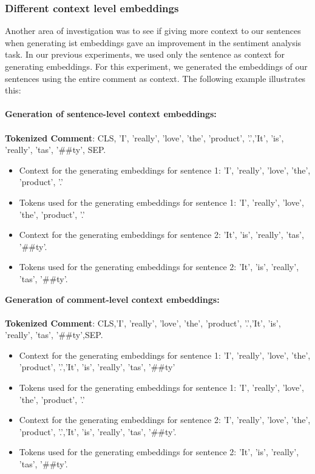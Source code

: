 \subsubsection{Different context level embeddings}
\label{sentenceCommentLevelContextExperiment}
Another area of investigation was to see if giving more context to our sentences when generating ist embeddings gave an improvement in the sentiment analysis task.
In our previous experiments, we used only the sentence as context for generating embeddings. For this experiment, we generated the embeddings of our sentences using the entire comment as context.
The following example illustrates this:\\\\
{\bf Generation of sentence-level context embeddings:}\\\\
{\bf Tokenized Comment}: CLS, {\color{TUMBlau}'I', 'really', 'love', 'the', 'product', '.'},{\color{red}'It', 'is', 'really', 'tas', '\#\#ty'}, SEP.\\
\begin{itemize}
  \item Context for the generating embeddings for {\color{TUMBlau} sentence 1}: 'I', 'really', 'love', 'the', 'product', '.'
  \item Tokens used for the generating embeddings for {\color{TUMBlau} sentence 1}: 'I', 'really', 'love', 'the', 'product', '.'
  \item Context for the generating embeddings for {\color{red} sentence 2}: 'It', 'is', 'really', 'tas', '\#\#ty'.
  \item Tokens used for the generating embeddings for {\color{red} sentence 2}: 'It', 'is', 'really', 'tas', '\#\#ty'.
\end{itemize}
{\bf Generation of comment-level context embeddings:}\\\\
{\bf Tokenized Comment}: CLS,{\color{TUMBlau}'I', 'really', 'love', 'the', 'product', '.'},{\color{red}'It', 'is', 'really', 'tas', '\#\#ty'},SEP.
\begin{itemize}
  \item Context for the generating embeddings for {\color{TUMBlau} sentence 1}: 'I', 'really', 'love', 'the', 'product', '.','It', 'is', 'really', 'tas', '\#\#ty'
  \item Tokens used for the generating embeddings for {\color{TUMBlau} sentence 1}: 'I', 'really', 'love', 'the', 'product', '.'
  \item Context for the generating embeddings for {\color{red} sentence 2}: 'I', 'really', 'love', 'the', 'product', '.','It', 'is', 'really', 'tas', '\#\#ty'.
  \item Tokens used for the generating embeddings for {\color{red} sentence 2}: 'It', 'is', 'really', 'tas', '\#\#ty'.
\end{itemize}
